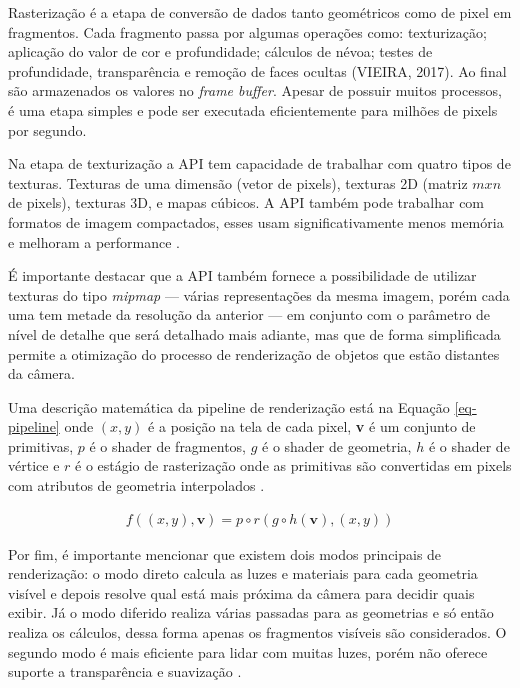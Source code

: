 Rasterização é a etapa de conversão de dados tanto geométricos como de pixel em fragmentos. Cada fragmento passa por algumas operações como: texturização; aplicação do valor de cor e profundidade; cálculos de névoa; testes de profundidade, transparência e remoção de faces ocultas (VIEIRA, 2017). Ao final são armazenados os valores no \textit{frame buffer}. Apesar de possuir muitos processos, é uma etapa simples e pode ser executada eficientemente para milhões de pixels por segundo.

Na etapa de texturização a API tem capacidade de trabalhar com quatro tipos de texturas. Texturas de uma dimensão (vetor de pixels), texturas 2D (matriz $ mxn $ de pixels), texturas 3D, e mapas cúbicos. A API também pode trabalhar com formatos de imagem compactados, esses usam significativamente menos memória e melhoram a performance \cite{GLSLBook}.

É importante destacar que a API também fornece a possibilidade de utilizar texturas do tipo \textit{mipmap} --- várias representações da mesma imagem, porém cada uma tem metade da resolução da anterior --- em conjunto com o parâmetro de nível de detalhe que será detalhado mais adiante, mas que de forma simplificada permite a otimização do processo de renderização de objetos que estão distantes da câmera. 

Uma descrição matemática da pipeline de renderização está na Equação \ref{eq-pipeline} onde $ (x, y) $ é a posição na tela de cada pixel, \textbf{v} é um conjunto de primitivas, $ p $ é o shader de fragmentos, $ g $ é o shader de geometria, $ h $ é o shader de vértice e $ r $ é o estágio de rasterização onde as primitivas são convertidas em pixels com atributos de geometria interpolados \cite{wang2014auto}.

\begin{equation} \label{eq-pipeline} \tag{1}
	\begin{aligned}
		f((x,y), \mathbf{v})=p \circ r(g \circ h(\mathbf{v}), (x,y)) 
	\end{aligned}
\end{equation}

Por fim, é importante mencionar que existem dois modos principais de renderização: o modo direto calcula as luzes e materiais para cada geometria visível e depois resolve qual está mais próxima da câmera para decidir quais exibir. Já o modo diferido realiza várias passadas para as geometrias e só então realiza os cálculos, dessa forma apenas os fragmentos visíveis são considerados. O segundo modo é mais eficiente para lidar com muitas luzes, porém não oferece suporte a transparência e suavização \cite{vsmid2017comparison}.

